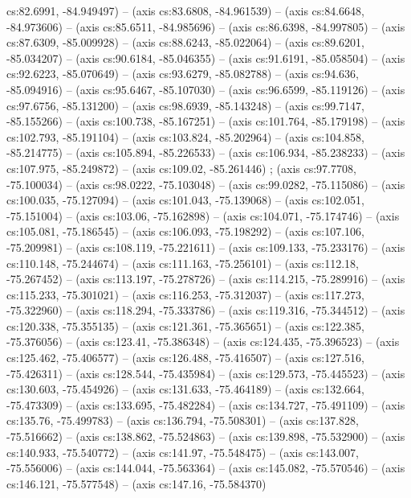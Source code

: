   cs:82.6991, -84.949497) -- (axis cs:83.6808, -84.961539) -- (axis
  cs:84.6648, -84.973606) -- (axis cs:85.6511, -84.985696) -- (axis
  cs:86.6398, -84.997805) -- (axis cs:87.6309, -85.009928) -- (axis
  cs:88.6243, -85.022064) -- (axis cs:89.6201, -85.034207) -- (axis
  cs:90.6184, -85.046355) -- (axis cs:91.6191, -85.058504) -- (axis
  cs:92.6223, -85.070649) -- (axis cs:93.6279, -85.082788) -- (axis cs:94.636,
  -85.094916) -- (axis cs:95.6467, -85.107030) -- (axis cs:96.6599,
  -85.119126) -- (axis cs:97.6756, -85.131200) -- (axis cs:98.6939,
  -85.143248) -- (axis cs:99.7147, -85.155266) -- (axis cs:100.738,
  -85.167251) -- (axis cs:101.764, -85.179198) -- (axis cs:102.793,
  -85.191104) -- (axis cs:103.824, -85.202964) -- (axis cs:104.858,
  -85.214775) -- (axis cs:105.894, -85.226533) -- (axis cs:106.934,
  -85.238233) -- (axis cs:107.975, -85.249872) -- (axis cs:109.02, -85.261446)
  ;  (axis cs:97.7708, -75.100034) -- (axis
  cs:98.0222, -75.103048) -- (axis cs:99.0282, -75.115086) -- (axis
  cs:100.035, -75.127094) -- (axis cs:101.043, -75.139068) -- (axis
  cs:102.051, -75.151004) -- (axis cs:103.06, -75.162898) -- (axis cs:104.071,
  -75.174746) -- (axis cs:105.081, -75.186545) -- (axis cs:106.093,
  -75.198292) -- (axis cs:107.106, -75.209981) -- (axis cs:108.119,
  -75.221611) -- (axis cs:109.133, -75.233176) -- (axis cs:110.148,
  -75.244674) -- (axis cs:111.163, -75.256101) -- (axis cs:112.18, -75.267452)
  -- (axis cs:113.197, -75.278726) -- (axis cs:114.215, -75.289916) -- (axis
  cs:115.233, -75.301021) -- (axis cs:116.253, -75.312037) -- (axis
  cs:117.273, -75.322960) -- (axis cs:118.294, -75.333786) -- (axis
  cs:119.316, -75.344512) -- (axis cs:120.338, -75.355135) -- (axis
  cs:121.361, -75.365651) -- (axis cs:122.385, -75.376056) -- (axis cs:123.41,
  -75.386348) -- (axis cs:124.435, -75.396523) -- (axis cs:125.462,
  -75.406577) -- (axis cs:126.488, -75.416507) -- (axis cs:127.516,
  -75.426311) -- (axis cs:128.544, -75.435984) -- (axis cs:129.573,
  -75.445523) -- (axis cs:130.603, -75.454926) -- (axis cs:131.633,
  -75.464189) -- (axis cs:132.664, -75.473309) -- (axis cs:133.695,
  -75.482284) -- (axis cs:134.727, -75.491109) -- (axis cs:135.76, -75.499783)
  -- (axis cs:136.794, -75.508301) -- (axis cs:137.828, -75.516662) -- (axis
  cs:138.862, -75.524863) -- (axis cs:139.898, -75.532900) -- (axis
  cs:140.933, -75.540772) -- (axis cs:141.97, -75.548475) -- (axis cs:143.007,
  -75.556006) -- (axis cs:144.044, -75.563364) -- (axis cs:145.082,
  -75.570546) -- (axis cs:146.121, -75.577548) -- (axis cs:147.16, -75.584370)
